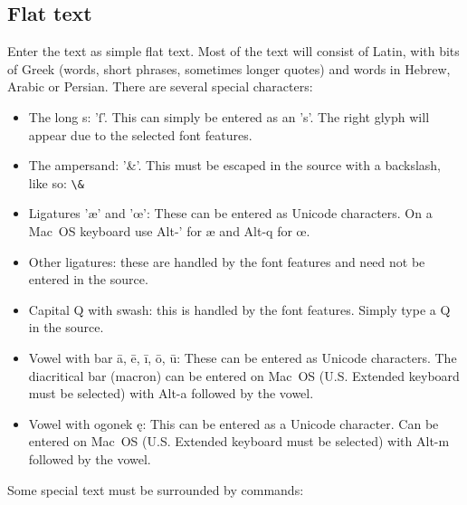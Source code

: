 \documentclass{report}
\begin{document}
\subsection{Flat text}
Enter the text as simple flat text. Most of the text will consist of Latin,
with bits of Greek (words, short phrases, sometimes longer quotes) and words
in Hebrew, Arabic or Persian. There are several special characters:
\begin{itemize}
\item The long s: 'ſ'. This can simply be entered as an 's'. The right glyph
will appear due to the selected font features.
\item The ampersand: '\&'. This must be escaped in the source with a backslash, like so: \verb;\&;
\item Ligatures 'æ' and 'œ': These can be entered as Unicode characters. On a Mac~OS keyboard use Alt-' for æ and Alt-q for œ.
\item Other ligatures: these are handled by the font features and need not be entered in the source.
\item  Capital Q with swash: this is handled by the font features. Simply type a Q in the source.
\item Vowel with bar ā, ē, ī, ō, ū: These can be entered as Unicode characters. The diacritical bar (macron) can be entered on Mac~OS (U.S. Extended keyboard must be selected) with Alt-a followed by the vowel.
\item Vowel with ogonek ę: This can be entered as a Unicode character. Can be entered on Mac~OS (U.S. Extended keyboard must be selected) with Alt-m followed by the vowel.
\end{itemize}
Some special text must be surrounded by commands:
\end{document}

